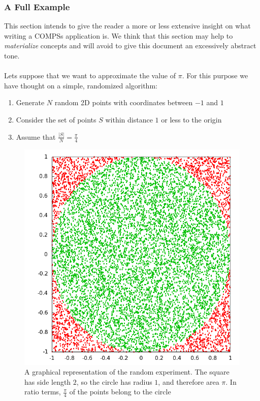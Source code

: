 \newpage
\subsubsection{A Full Example}
\label{subsec:compss_example}
This section intends to give the reader a more or less extensive insight on what writing a COMPSs application is. We think that this section may help to \textit{materialize} concepts and will avoid to give this document an excessively abstract tone.\\
\\
Lets suppose that we want to approximate the value of $\pi$. For this purpose we have thought on a simple, randomized algorithm:
\begin{enumerate}
\item Generate $N$ random 2D points with coordinates between $-1$ and $1$
\item Consider the set of points $S$ within distance $1$ or less to the origin
\item Assume that $\frac{|S|}{N} = \frac{\pi}{4}$
\end{enumerate}

\begin{figure}[ht!]
\centering
\includegraphics[scale=0.5]{figures/circle_square.png}
\caption{A graphical representation of the random experiment. The square has side length $2$, so the circle has radius $1$, and therefore area $\pi$. In ratio terms, $\frac{\pi}{4}$ of the points belong to the circle}
\label{fig:circle_square}
\end{figure}

